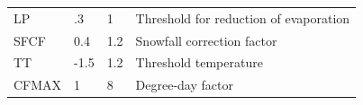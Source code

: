 \documentclass[
]{book}
\begin{document}
\begin{longtable}[]{@{}llll@{}}
\begin{minipage}[t]{0.29\columnwidth}\raggedright
LP\strut
\end{minipage} & \begin{minipage}[t]{0.16\columnwidth}\raggedright
.3\strut
\end{minipage} & \begin{minipage}[t]{0.13\columnwidth}\raggedright
1\strut
\end{minipage} & \begin{minipage}[t]{0.31\columnwidth}\raggedright
Threshold for reduction of evaporation\strut
\end{minipage}\tabularnewline
\begin{minipage}[t]{0.29\columnwidth}\raggedright
SFCF\strut
\end{minipage} & \begin{minipage}[t]{0.16\columnwidth}\raggedright
0.4\strut
\end{minipage} & \begin{minipage}[t]{0.13\columnwidth}\raggedright
1.2\strut
\end{minipage} & \begin{minipage}[t]{0.31\columnwidth}\raggedright
Snowfall correction factor\strut
\end{minipage}\tabularnewline
\begin{minipage}[t]{0.29\columnwidth}\raggedright
TT\strut
\end{minipage} & \begin{minipage}[t]{0.16\columnwidth}\raggedright
-1.5\strut
\end{minipage} & \begin{minipage}[t]{0.13\columnwidth}\raggedright
1.2\strut
\end{minipage} & \begin{minipage}[t]{0.31\columnwidth}\raggedright
Threshold temperature\strut
\end{minipage}\tabularnewline
\begin{minipage}[t]{0.29\columnwidth}\raggedright
CFMAX\strut
\end{minipage} & \begin{minipage}[t]{0.16\columnwidth}\raggedright
1\strut
\end{minipage} & \begin{minipage}[t]{0.13\columnwidth}\raggedright
8\strut
\end{minipage} & \begin{minipage}[t]{0.31\columnwidth}\raggedright
Degree-day factor\strut
\end{minipage}\tabularnewline

\end{longtable}
\end{document}
